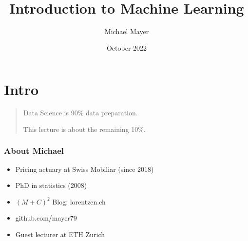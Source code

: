 \documentclass[
    utf8,
    aspectratio=169
]{beamer}  %
\title{Introduction to Machine Learning}
\author{Michael Mayer}
\date{October 2022}
\begin{document}

\frame{\titlepage}


\section{Intro}

\begin{frame}
\begin{quotation}
	\begin{huge}
		\begin{center}
			Data Science is 90\% data preparation.
	
			This lecture is about the remaining 10\%.
		\end{center}
	\end{huge}
\end{quotation}
\end{frame}

\begin{frame}
	\frametitle{About Michael}
	\begin{itemize}
		\item Pricing actuary at Swiss Mobiliar (since 2018)
		\item PhD in statistics (2008)
		\item $(M+C)^2$ Blog: lorentzen.ch
		\item github.com/mayer79
		\item Guest lecturer at ETH Zurich
	\end{itemize}
\end{frame}
\end{document}
